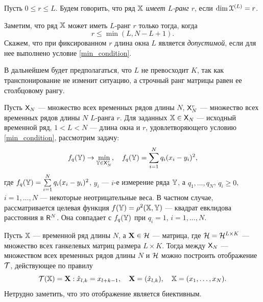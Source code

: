\documentclass[12pt,a4paper,fleqn,leqno]{article}
\begin{document}
\begin{definition}
Пусть $0 \le r \le L$. Будем говорить, что ряд $\mathbb{X}$ \emph{имеет $L$-ранг $r$}, если $\dim \EuScript{X}^{(L)} = r$.
\end{definition}

Заметим, что ряд $\mathbb{X}$ может иметь $L$-ранг $r$ только тогда, когда
\begin{equation}
r \le \min(L, N-L+1). \label{min_condition}
\end{equation}
Скажем, что при фиксированном $r$ длина окна $L$ является \emph{допустимой}, если для нее выполнено условие \eqref{min_condition}.

В дальнейшем будет предполагаться, что $L$ не превосходит $K$, так как транспонирование не изменит ситуацию, а строчный ранг матрицы равен ее столбцовому рангу.

Пусть $\mathsf{X}_N$ --- множество всех временных рядов длины $N$, $\mathsf{X}_N^r$ --- множество всех временных рядов длины $N$ $L$-ранга $r$. Для заданных $\mathbb{X} \in \mathsf{X}_N$ --- исходный временной ряд, $1 < L < N$ --- длина окна и $r$, удовлетворяющего условию \eqref{min_condition}, рассмотрим задачу:
\begin{equation} \label{L-rank_task}
f_q(\mathbb{Y}) \to \min_{\mathbb{Y} \in \mathsf{X}_N^r}, \quad f_q(\mathbb{Y}) = \sum \limits_{i=1}^N q_i(x_i - y_i)^2,
\end{equation}
где $f_q(\mathbb{Y}) = \sum \limits_{i=1}^N q_i(x_i - y_i)^2$, $y_i$ --- $i$-е измерение ряда $\mathbb{Y}$, а $q_1, \ldots, q_N$, $q_i \ge 0$, $i = 1, \ldots, N$ --- некоторые неотрицательные веса. В частном случае, рассматривается целевая функция $f(\mathbb{Y}) = \rho^2(\mathbb{X}, \mathbb{Y})$ --- квадрат евклидова расстояния в $\mathsf{R}^N$. Она совпадает с $f_q(\mathbb{Y})$ при $q_i = 1$, $i = 1, \ldots, N$.

Пусть $\mathbb{X}$ --- временной ряд длины $N$, а $\mathbf{X} \in \mathcal{H}$ --- матрица, где $\mathcal{H} = \mathcal{H}^{L \times K}$ --- множество всех ганкелевых матриц размера $L \times K$. Тогда между $\mathsf{X}_N$ --- множеством всех временных рядов длины $N$ и $\mathcal{H}$ можно построить отображение $\mathcal{T}$, действующее по правилу
\begin{equation*}
\mathcal{T}(\mathbb{X}) = \mathbf{X}: \hat x_{l, k} = x_{l + k - 1}, \quad \mathbf{X} = (\hat x_{l,k}), \quad \mathbb{X} = (x_1, \ldots, x_N).
\end{equation*}
Нетрудно заметить, что это отображение является биективным.
\end{document}
